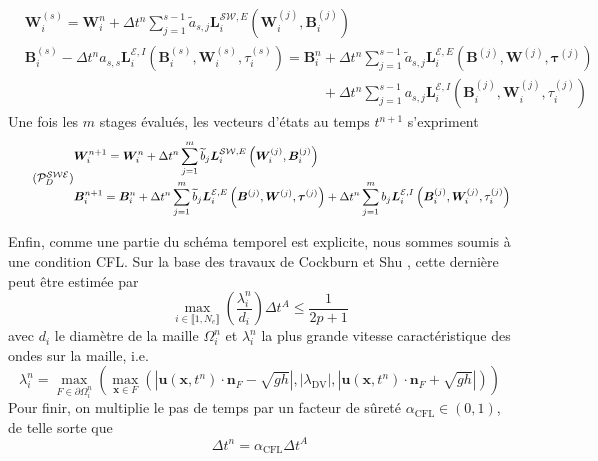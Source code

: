 \documentclass[11pt, a4paper, oneside]{report}
\begin{document}
\begin{equation}
    \begin{aligned}
        & \bm{W}_i^{(s)} = \bm{W}_i^n + \Delta t^n \sum_{j = 1}^{s-1} \widetilde{a}_{s, j} \bm{L}_i^{\mathcal{SW}, E} \left( \bm{W}_i^{(j)}, \bm{B}_i^{(j)} \right) \\
        & \bm{B}_i^{(s)} - \Delta t^n a_{s, s} \bm{L}_i^{\mathcal{E}, I} \left( \bm{B}_i^{(s)}, \bm{W}_i^{(s)}, \tau_i^{(s)} \right) = \bm{B}_i^n + \Delta t^n \sum_{j = 1}^{s-1} \widetilde{a}_{s, j} \bm{L}_i^{\mathcal{E}, E} \left( \bm{B}^{(j)}, \bm{W}^{(j)}, \bm{\tau}^{(j)} \right) \\
        & \phantom{\bm{B}_i^{(s)} - \Delta t^n a_{s, s} \bm{L}_i^{\mathcal{E}, I} \left( \bm{B}_i^{(s)}, \bm{W}_i^{(s)}, \tau_i^{(s)} \right) = \bm{B}_i^n } + \Delta t^n \sum_{j = 1}^{s-1} a_{s, j} \bm{L}_i^{\mathcal{E}, I} \left( \bm{B}_i^{(j)}, \bm{W}_i^{(j)}, \tau_i^{(j)} \right)
    \end{aligned}
\end{equation}
Une fois les $m$ stages évalués, les vecteurs d'états au temps $t^{n+1}$ s'expriment
\begin{equation} \tag{$\mathcal{P}_D^\mathcal{SWE}$} \label{eq:Probleme_discret_Saint_Venant_Exner}
    \begin{aligned}
        & \bm{W}_i^{n+1} = \bm{W}_i^n + \Delta t^n \sum_{j = 1}^{m} \widetilde{b}_j \bm{L}_i^{\mathcal{SW}, E} \left( \bm{W}_i^{(j)}, \bm{B}_i^{(j)} \right) \\
        & \bm{B}_i^{n+1} = \bm{B}_i^n + \Delta t^n \sum_{j = 1}^{m} \widetilde{b}_j \bm{L}_i^{\mathcal{E}, E} \left( \bm{B}^{(j)}, \bm{W}^{(j)}, \bm{\tau}^{(j)} \right) + \Delta t^n \sum_{j = 1}^{m} b_j \bm{L}_i^{\mathcal{E}, I} \left( \bm{B}_i^{(j)}, \bm{W}_i^{(j)}, \tau_i^{(j)} \right)
    \end{aligned}
\end{equation}

Enfin, comme une partie du schéma temporel est explicite, nous sommes soumis à une condition CFL. Sur la base des travaux de Cockburn et Shu \cite{cockburn2001runge}, cette dernière peut être estimée par
\begin{equation}
    \max_{i \in \llbracket 1, N_e \rrbracket} \left( \frac{\lambda_i^n}{d_i} \right) \Delta t^A \leq \frac{1}{2p + 1}
\end{equation}
avec $d_i$ le diamètre de la maille $\Omega_i^n$ et $\lambda_i^n$ la plus grande vitesse caractéristique des ondes sur la maille, i.e.
\begin{equation}
    \lambda_i^n = \max_{F \in \partial \Omega_i^n} \left( \max_{\bm{x} \in F} \left( \left| \bm{u}(\bm{x}, t^n) \cdot \bm{n}_F - \sqrt{gh} \right|, \left| \lambda_\text{DV} \right|, \left| \bm{u}(\bm{x}, t^n) \cdot \bm{n}_F + \sqrt{gh} \right| \right) \right)
\end{equation}
Pour finir, on multiplie le pas de temps par un facteur de sûreté $\alpha_\text{CFL} \in (0,1)$, de telle sorte que
\begin{equation}
    \Delta t^n = \alpha_\text{CFL} \Delta t^A
\end{equation}
\end{document}
